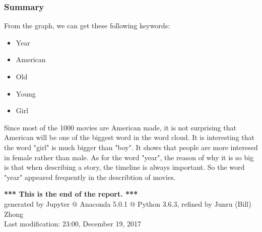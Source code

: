 \documentclass[11pt]{article}
\begin{document}
    \subsubsection{Summary}\label{summary}

From the graph, we can get these following keywords:
\begin{itemize}
    \item Year
    \item American
    \item Old
    \item Young
    \item Girl
\end{itemize}
Since most of the 1000 movies are American made, it is not surprising
that American will be one of the biggest word in the word cloud. It is
interesting that the word "girl" is much bigger than "boy". It shows
that people are more interesed in female rather than male. As for the
word "year", the reason of why it is so big is that when describing a
story, the timeline is always important. So the word "year" appeared
frequently in the describtion of movies.

\begin{center}
    \textbf{*** This is the end of the report. ***}
    \\
     generated by Jupyter @ Anaconda 5.0.1 @ Python 3.6.3, refined by Junru (Bill) Zhong
    \\
    Last modification: 23:00, December 19, 2017
\end{center}
    
    
\end{document}
